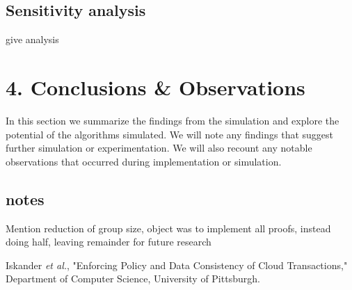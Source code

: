 \documentclass[11pt]{article}
\begin{document}
\subsection{Sensitivity analysis}
give analysis
\section{4. Conclusions \& Observations}
In this section we summarize the findings from the simulation and explore the potential of the algorithms simulated. We will note any findings that suggest further simulation or experimentation. We will also recount any notable observations that occurred during implementation or simulation.
\subsection{notes}
Mention reduction of group size, object was to implement all proofs, instead doing half, leaving remainder for future research
\begin{thebibliography}{9}
 Iskander \emph{et al.}, "Enforcing Policy and Data Consistency of Cloud Transactions," Department of Computer Science, University of Pittsburgh.
\end{thebibliography}
\end{document}
